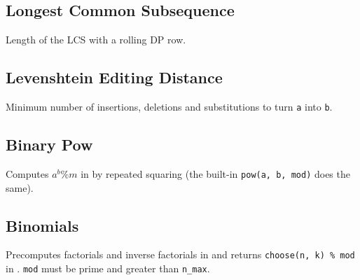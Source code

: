 \subsection{Longest Common Subsequence}
Length of the LCS with a rolling DP row.

\subsection{Levenshtein Editing Distance}
Minimum number of insertions, deletions and substitutions to turn \verb|a| into \verb|b|.

\subsection{Binary Pow}
Computes $a^b \% m$ in  by repeated squaring (the built-in \verb|pow(a, b, mod)| does the same).

\subsection{Binomials}
Precomputes factorials and inverse factorials in  and returns \verb|choose(n, k) % mod| in . \verb|mod| must be prime and greater than \verb|n_max|.
